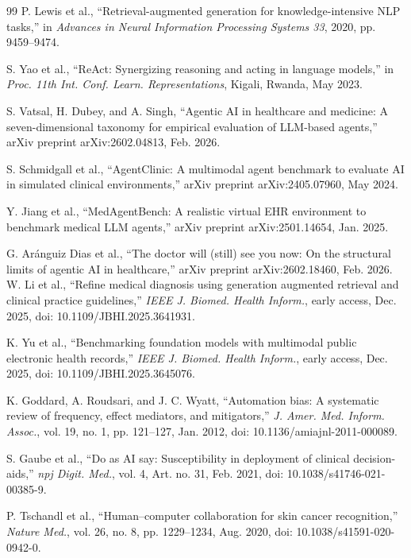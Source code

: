 \documentclass[journal,twoside,web]{ieeecolor}
\begin{document}
\begin{thebibliography}{99}
P. Lewis et al.,
``Retrieval-augmented generation for knowledge-intensive NLP tasks,''
in \textit{Advances in Neural Information Processing Systems 33}, 2020,
pp. 9459--9474.

S. Yao et al.,
``ReAct: Synergizing reasoning and acting in language models,''
in \textit{Proc. 11th Int. Conf. Learn. Representations}, Kigali, Rwanda, May 2023.

S. Vatsal, H. Dubey, and A. Singh,
``Agentic AI in healthcare and medicine: A seven-dimensional taxonomy for empirical evaluation of LLM-based agents,''
arXiv preprint arXiv:2602.04813, Feb. 2026.

S. Schmidgall et al.,
``AgentClinic: A multimodal agent benchmark to evaluate AI in simulated clinical environments,''
arXiv preprint arXiv:2405.07960, May 2024.

Y. Jiang et al.,
``MedAgentBench: A realistic virtual EHR environment to benchmark medical LLM agents,''
arXiv preprint arXiv:2501.14654, Jan. 2025.

G. Ar\'anguiz Dias et al.,
``The doctor will (still) see you now: On the structural limits of agentic AI in healthcare,''
arXiv preprint arXiv:2602.18460, Feb. 2026.  
W. Li et al.,
``Refine medical diagnosis using generation augmented retrieval and clinical practice guidelines,''
\textit{IEEE J. Biomed. Health Inform.}, early access, Dec. 2025,
doi: 10.1109/JBHI.2025.3641931.

K. Yu et al.,
``Benchmarking foundation models with multimodal public electronic health records,''
\textit{IEEE J. Biomed. Health Inform.}, early access, Dec. 2025,
doi: 10.1109/JBHI.2025.3645076.



K. Goddard, A. Roudsari, and J. C. Wyatt,
``Automation bias: A systematic review of frequency, effect mediators, and mitigators,''
\textit{J. Amer. Med. Inform. Assoc.}, vol. 19, no. 1, pp. 121--127, Jan. 2012,
doi: 10.1136/amiajnl-2011-000089.

S. Gaube et al.,
``Do as AI say: Susceptibility in deployment of clinical decision-aids,''
\textit{npj Digit. Med.}, vol. 4, Art. no. 31, Feb. 2021,
doi: 10.1038/s41746-021-00385-9.

P. Tschandl et al.,
``Human--computer collaboration for skin cancer recognition,''
\textit{Nature Med.}, vol. 26, no. 8, pp. 1229--1234, Aug. 2020,
doi: 10.1038/s41591-020-0942-0.


\end{thebibliography}
\end{document}
